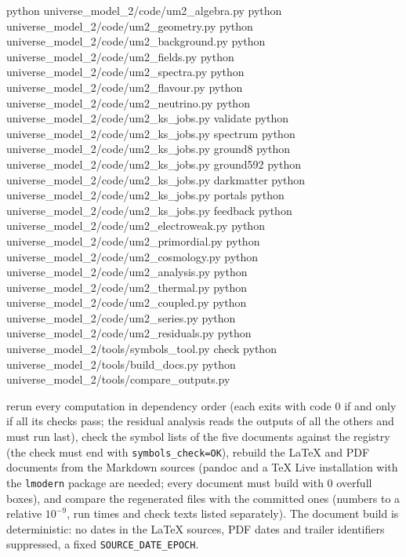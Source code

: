 \documentclass[
  10pt,
]{article}
\newenvironment{Shaded}{}{}
\newcommand{\NormalTok}[1]{#1}
\begin{document}
\begin{Shaded}
\begin{Highlighting}[]
\NormalTok{python universe\_model\_2/code/um2\_algebra.py}
\NormalTok{python universe\_model\_2/code/um2\_geometry.py}
\NormalTok{python universe\_model\_2/code/um2\_background.py}
\NormalTok{python universe\_model\_2/code/um2\_fields.py}
\NormalTok{python universe\_model\_2/code/um2\_spectra.py}
\NormalTok{python universe\_model\_2/code/um2\_flavour.py}
\NormalTok{python universe\_model\_2/code/um2\_neutrino.py}
\NormalTok{python universe\_model\_2/code/um2\_ks\_jobs.py validate}
\NormalTok{python universe\_model\_2/code/um2\_ks\_jobs.py spectrum}
\NormalTok{python universe\_model\_2/code/um2\_ks\_jobs.py ground8}
\NormalTok{python universe\_model\_2/code/um2\_ks\_jobs.py ground592}
\NormalTok{python universe\_model\_2/code/um2\_ks\_jobs.py darkmatter}
\NormalTok{python universe\_model\_2/code/um2\_ks\_jobs.py portals}
\NormalTok{python universe\_model\_2/code/um2\_ks\_jobs.py feedback}
\NormalTok{python universe\_model\_2/code/um2\_electroweak.py}
\NormalTok{python universe\_model\_2/code/um2\_primordial.py}
\NormalTok{python universe\_model\_2/code/um2\_cosmology.py}
\NormalTok{python universe\_model\_2/code/um2\_analysis.py}
\NormalTok{python universe\_model\_2/code/um2\_thermal.py}
\NormalTok{python universe\_model\_2/code/um2\_coupled.py}
\NormalTok{python universe\_model\_2/code/um2\_series.py}
\NormalTok{python universe\_model\_2/code/um2\_residuals.py}
\NormalTok{python universe\_model\_2/tools/symbols\_tool.py check}
\NormalTok{python universe\_model\_2/tools/build\_docs.py}
\NormalTok{python universe\_model\_2/tools/compare\_outputs.py}
\end{Highlighting}
\end{Shaded}

rerun every computation in dependency order (each exits with code 0 if
and only if all its checks pass; the residual analysis reads the outputs
of all the others and must run last), check the symbol lists of the five
documents against the registry (the check must end with
\texttt{symbols\_check=OK}), rebuild the LaTeX and PDF documents from
the Markdown sources (pandoc and a TeX Live installation with the
\texttt{lmodern} package are needed; every document must build with 0
overfull boxes), and compare the regenerated files with the committed
ones (numbers to a relative \(10^{-9}\), run times and check texts
listed separately). The document build is deterministic: no dates in the
LaTeX sources, PDF dates and trailer identifiers suppressed, a fixed
\texttt{SOURCE\_DATE\_EPOCH}.
\end{document}
